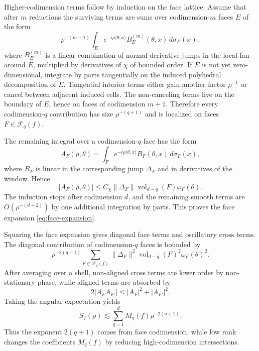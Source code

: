 Higher-codimension terms follow by induction on the face lattice. Assume that after $m$ reductions the surviving terms are sums over codimension-$m$ faces $E$ of the form
\begin{equation}
\rho^{-(m+1)}
\int_E
e^{-i\rho\langle\theta,x\rangle}
B_E^{(m)}(\theta,x)\,d\sigma_E(x),
\end{equation}
where $B_E^{(m)}$ is a linear combination of normal-derivative jumps in the local fan around $E$, multiplied by derivatives of $\chi$ of bounded order. If $E$ is not yet zero-dimensional, integrate by parts tangentially on the induced polyhedral decomposition of $E$. Tangential interior terms either gain another factor $\rho^{-1}$ or cancel between adjacent induced cells. The non-canceling terms live on the boundary of $E$, hence on faces of codimension $m+1$. Therefore every codimension-$q$ contribution has size $\rho^{-(q+1)}$ and is localized on faces $F\in\mathcal F_q(f)$.

The remaining integral over a codimension-$q$ face has the form
\begin{equation}
A_F(\rho,\theta)
=
\int_F e^{-i\rho\langle \theta,x\rangle}
B_F(\theta,x)\,d\sigma_F(x),
\end{equation}
where $B_F$ is linear in the corresponding jump $\Delta_F$ and in derivatives of the window. Hence
\begin{equation}
|A_F(\rho,\theta)|
\le
C_\chi\|\Delta_F\|
\operatorname{vol}_{d-q}(F)\omega_F(\theta).
\end{equation}
The induction stops after codimension $d$, and the remaining smooth terms are $O(\rho^{-(d+2)})$ by one additional integration by parts. This proves the face expansion \eqref{eq:face-expansion}.

Squaring the face expansion gives diagonal face terms and oscillatory cross terms. The diagonal contribution of codimension-$q$ faces is bounded by
\begin{equation}
\rho^{-2(q+1)}
\sum_{F\in\mathcal F_q(f)}
\|\Delta_F\|^2
\operatorname{vol}_{d-q}(F)^2
\omega_F(\theta)^2 .
\end{equation}
After averaging over a shell, non-aligned cross terms are lower order by non-stationary phase, while aligned terms are absorbed by
\begin{equation}
2|A_F A_{F'}|\le |A_F|^2+|A_{F'}|^2 .
\end{equation}
Taking the angular expectation yields
\begin{equation}
S_f(\rho)\lesssim
\sum_{q=1}^d
M_q(f)\rho^{-2(q+1)} .
\end{equation}
Thus the exponent $2(q+1)$ comes from face codimension, while low rank changes the coefficients $M_q(f)$ by reducing high-codimension intersections.

